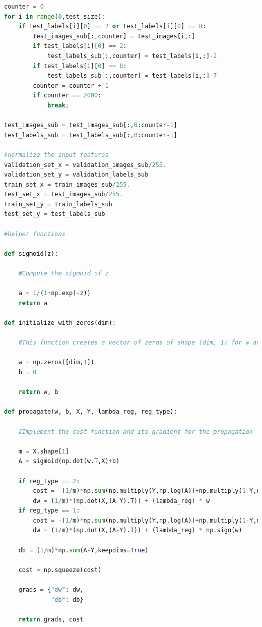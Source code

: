 \documentclass{article} %
\begin{document}
{\begin{lstlisting}[language=Python]
counter = 0
for i in range(0,test_size):
    if test_labels[i][0] == 2 or test_labels[i][0] == 8:
        test_images_sub[:,counter] = test_images[i,:]
        if test_labels[i][0] == 2:
            test_labels_sub[:,counter] = test_labels[i,:]-2
        if test_labels[i][0] == 8:
            test_labels_sub[:,counter] = test_labels[i,:]-7
        counter = counter + 1        
        if counter == 2000:
            break;
        
test_images_sub = test_images_sub[:,0:counter-1]
test_labels_sub = test_labels_sub[:,0:counter-1]

#normalize the input features
validation_set_x = validation_images_sub/255.
validation_set_y = validation_labels_sub
train_set_x = train_images_sub/255.
test_set_x = test_images_sub/255.
train_set_y = train_labels_sub
test_set_y = test_labels_sub

#helper functions

def sigmoid(z):

    #Compute the sigmoid of z

    a = 1/(1+np.exp(-z))  
    return a

def initialize_with_zeros(dim):

    #This function creates a vector of zeros of shape (dim, 1) for w and initializes b to 0.

    w = np.zeros([dim,1])
    b = 0
    
    return w, b

def propagate(w, b, X, Y, lambda_reg, reg_type):
   
    #Implement the cost function and its gradient for the propagation
    
    m = X.shape[1]
    A = sigmoid(np.dot(w.T,X)+b)
    
    if reg_type == 2:
        cost = -(1/m)*np.sum(np.multiply(Y,np.log(A))+np.multiply(1-Y,np.log(1-A)),keepdims=True) + (lambda_reg/2) * np.sum(np.power(w,2)) 
        dw = (1/m)*(np.dot(X,(A-Y).T)) + (lambda_reg) * w
    if reg_type == 1:
        cost = -(1/m)*np.sum(np.multiply(Y,np.log(A))+np.multiply(1-Y,np.log(1-A)),keepdims=True) + (lambda_reg) * np.sum(np.abs(w))
        dw = (1/m)*(np.dot(X,(A-Y).T)) + (lambda_reg) * np.sign(w)
    
    db = (1/m)*np.sum(A-Y,keepdims=True)

    cost = np.squeeze(cost)
    
    grads = {"dw": dw,
             "db": db}
    
    return grads, cost


\end{lstlisting}}
\end{document}
